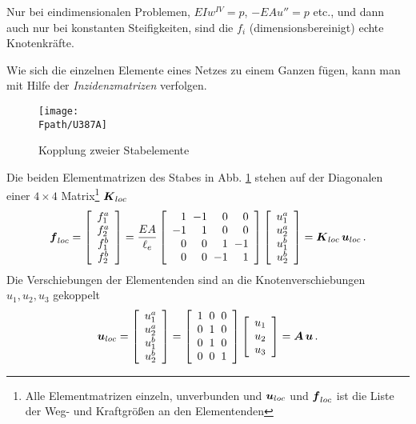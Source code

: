 Nur bei eindimensionalen Problemen, $EI w^{IV} = p$, $-EA u'' =  p$ etc., und dann auch nur bei konstanten Steifigkeiten, sind die $f_i$ (dimensionsbereinigt) echte Knotenkr\"{a}fte.


Wie sich die einzelnen Elemente eines Netzes zu einem Ganzen f\"{u}gen, kann man mit Hilfe der {\em Inzidenzmatrizen\/} verfolgen.

\begin{figure}[tbp]
\centering
\texttt{[image: \\Fpath/U387A]}
\caption{Kopplung zweier Stabelemente }
\label{U387}
\end{figure}%

Die beiden Elementmatrizen des Stabes in Abb. \ref{U387} stehen auf der Diagonalen einer $4 \times 4$ Matrix\footnote{Alle Elementmatrizen einzeln, unverbunden und $\mbox{\boldmath $u$}_{loc}$  und $\mbox{\boldmath $f$}_{loc}$ ist die Liste der Weg- und Kraftgr\"{o}{\ss}en an den Elementenden } $\mbox{\boldmath $K$}_{loc}$
\begin{align}\label{Eq193}
\vek f_{loc} = \left[ \barr{c} f_1^a \\ f_2^a \\ f_1^b \\ f_2^b \earr \right] =  \frac{EA}{\ell_e} \left [
\barr {r @{\hspace{2mm}} r @{\hspace{2mm}} r @{\hspace{2mm}} r} 1 & -1 & 0 & 0 \\ -1 & 1 & 0 & 0 \\ 0 & 0 & 1 & -1 \\ 0 & 0 & -1 & 1 \\ \earr \right] \left[ \barr{cc} u_1^a \\ u_2^a \\ u_1^b \\ u_2^b \earr \right] = \vek K_{loc}\,\vek u_{loc}\,.
\end{align}
Die Verschiebungen der Elementenden sind an die Knotenverschiebungen $u_1, u_2, u_3$ gekoppelt
\begin{align}
\vek u_{loc} = \left[ \barr{c} u_1^a \\ u_2^a \\ u_1^b \\ u_2^b \earr \right] = \left [
\barr {r @{\hspace{2mm}} r @{\hspace{2mm}} r } 1 & 0 & 0  \\ 0 & 1 & 0 \\ 0 & 1 & 0 \\ 0 & 0 &  1 \\ \earr \right] \left[ \barr{cc} u_1 \\ u_2 \\ u_3 \earr \right] = \vek  A\,\vek u\,.
\end{align}
